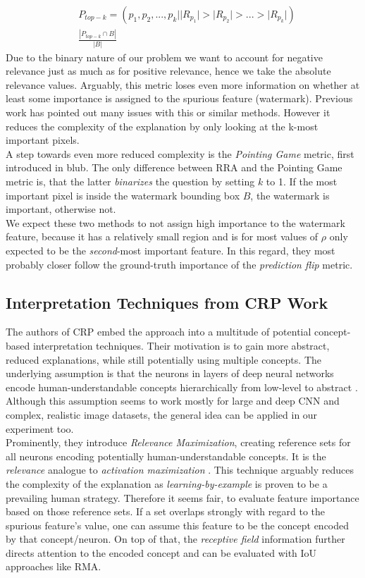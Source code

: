 \begin{align*}
& P_{top-k} = (p_1, p_2,...,p_k | |R_{p_1}| > |R_{p_2}| > ... > |R_{p_k}| ) \\
& \frac{|P_{top-k} \cap B|}{|B|}
\end{align*}
Due to the binary nature of our problem we want to account for negative relevance just as much as for positive relevance, hence we take the absolute relevance values.
Arguably, this metric loses even more information on whether at least some importance is assigned to the spurious feature (watermark). Previous work has pointed out many issues with this or similar methods. However it reduces the complexity of the explanation by only looking at the k-most important pixels. \\

A step towards even more reduced complexity is the \textit{Pointing Game} metric, first introduced in blub. The only difference between RRA and the Pointing Game metric is, that the latter \textit{binarizes} the question by setting $k$ to 1. If the most important pixel is inside the watermark bounding box $B$, the watermark is important, otherwise not. \\

We expect these two methods to not assign high importance to the watermark feature, because it has a relatively small region and is for most values of $\rho$ only expected to be the \textit{second}-most important feature. In this regard, they most probably closer follow the ground-truth importance of the \textit{prediction flip} metric.

\subsection{Interpretation Techniques from CRP Work}
The authors of CRP embed the approach into a multitude of potential concept-based interpretation techniques. Their motivation is to gain more abstract, reduced explanations, while still potentially using multiple concepts. The underlying assumption is that the neurons in layers of deep neural networks encode human-understandable concepts hierarchically from low-level to abstract \cite{Zeiler2013,Bau2017}. Although this assumption seems to work mostly for large and deep CNN and complex, realistic image datasets, the general idea can be applied in our experiment too. \\

Prominently, they introduce \textit{Relevance Maximization}, creating reference sets for all neurons encoding potentially human-understandable concepts. It is the \textit{relevance} analogue to \textit{activation maximization} \cite{Nguyen2016}. This technique arguably reduces the complexity of the explanation as \textit{learning-by-example} is proven to be a prevailing human strategy.
Therefore it seems fair, to evaluate feature importance based on those reference sets. If a set overlaps strongly with regard to the spurious feature's value, one can assume this feature to be the concept encoded by that concept/neuron. 
On top of that, the \textit{receptive field} information further directs attention to the encoded concept and can be evaluated with IoU approaches like RMA. 

